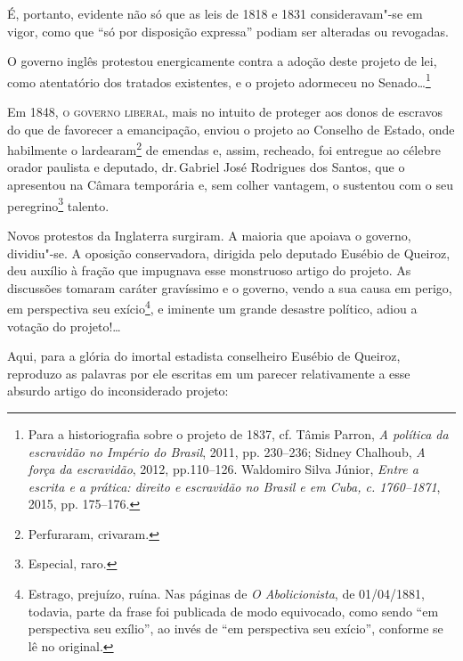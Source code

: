 É, portanto, evidente não só que as leis de 1818 e 1831 consideravam"-se
em vigor, como que ``só por disposição expressa'' podiam ser alteradas ou
revogadas.

O governo inglês protestou energicamente contra a adoção deste projeto
de lei, como atentatório dos tratados existentes, e o projeto adormeceu
no Senado\ldots{}\footnote{Para a historiografia sobre o projeto de 1837,
  cf. Tâmis Parron, \emph{A política da escravidão no Império do
  Brasil}, 2011, pp. 230--236; Sidney Chalhoub, \emph{A força da
  escravidão}, 2012, pp.110--126. Waldomiro Silva Júnior, \emph{Entre a
  escrita e a prática: direito e escravidão no Brasil e em Cuba, c.
  1760--1871}, 2015, pp. 175--176.}

Em 1848, \textsc{o governo liberal}, mais no intuito de proteger aos donos de
escravos do que de favorecer a emancipação, enviou o projeto ao Conselho
de Estado, onde habilmente o lardearam\footnote{Perfuraram, crivaram.}
de emendas e, assim, recheado, foi entregue ao célebre orador paulista e
deputado, dr.\,Gabriel José Rodrigues dos Santos, que o apresentou na
Câmara temporária e, sem colher vantagem, o sustentou com o seu
peregrino\footnote{Especial, raro.} talento.

Novos protestos da Inglaterra surgiram. A maioria que apoiava o governo,
dividiu"-se. A oposição conservadora, dirigida pelo deputado Eusébio de
Queiroz, deu auxílio à fração que impugnava esse monstruoso artigo do
projeto. As discussões tomaram caráter gravíssimo e o governo, vendo a
sua causa em perigo, em perspectiva seu exício\footnote{Estrago,
  prejuízo, ruína. Nas páginas de \emph{O Abolicionista}, de 01/04/1881,
  todavia, parte da frase foi publicada de modo equivocado, como sendo
  ``em perspectiva seu exílio'', ao invés de ``em perspectiva seu exício'',
  conforme se lê no original.}, e iminente um grande desastre político,
adiou a votação do projeto!\ldots{}

Aqui, para a glória do imortal estadista conselheiro Eusébio de Queiroz,
reproduzo as palavras por ele escritas em um parecer relativamente a
esse absurdo artigo do inconsiderado projeto:

